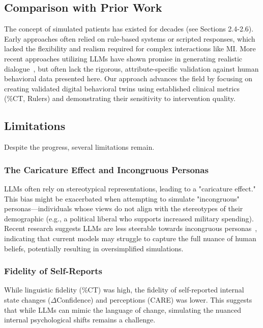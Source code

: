 \subsection{Comparison with Prior Work}

The concept of simulated patients has existed for decades (see Sections 2.4-2.6). Early approaches often relied on rule-based systems or scripted responses, which lacked the flexibility and realism required for complex interactions like MI. More recent approaches utilizing LLMs have shown promise in generating realistic dialogue~\citep{cheng2023gpatients}, but often lack the rigorous, attribute-specific validation against human behavioral data presented here. Our approach advances the field by focusing on creating validated digital behavioral twins using established clinical metrics (\%CT, Rulers) and demonstrating their sensitivity to intervention quality.

\subsection{Limitations}

Despite the progress, several limitations remain.

\subsubsection{The Caricature Effect and Incongruous Personas}

LLMs often rely on stereotypical representations, leading to a "caricature effect." This bias might be exacerbated when attempting to simulate "incongruous" personas—individuals whose views do not align with the stereotypes of their demographic (e.g., a political liberal who supports increased military spending). Recent research suggests LLMs are less steerable towards incongruous personas~\citep{liu2024evaluating}, indicating that current models may struggle to capture the full nuance of human beliefs, potentially resulting in oversimplified simulations.

\subsubsection{Fidelity of Self-Reports}

While linguistic fidelity (\%CT) was high, the fidelity of self-reported internal state changes ($\Delta$Confidence) and perceptions (CARE) was lower. This suggests that while LLMs can mimic the language of change, simulating the nuanced internal psychological shifts remains a challenge.

